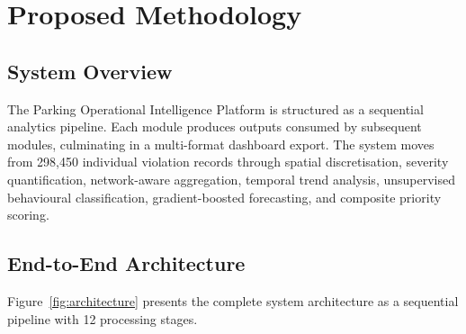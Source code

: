 \documentclass[12pt,a4paper]{article}
\begin{document}

\section{Proposed Methodology}

\subsection{System Overview}

The Parking Operational Intelligence Platform is structured as a sequential analytics
pipeline. Each module produces outputs consumed by subsequent modules, culminating in a
multi-format dashboard export. The system moves from 298,450 individual violation records
through spatial discretisation, severity quantification, network-aware aggregation, temporal
trend analysis, unsupervised behavioural classification, gradient-boosted forecasting, and
composite priority scoring.

\subsection{End-to-End Architecture}

Figure~\ref{fig:architecture} presents the complete system architecture as a sequential
pipeline with 12 processing stages.
\end{document}
